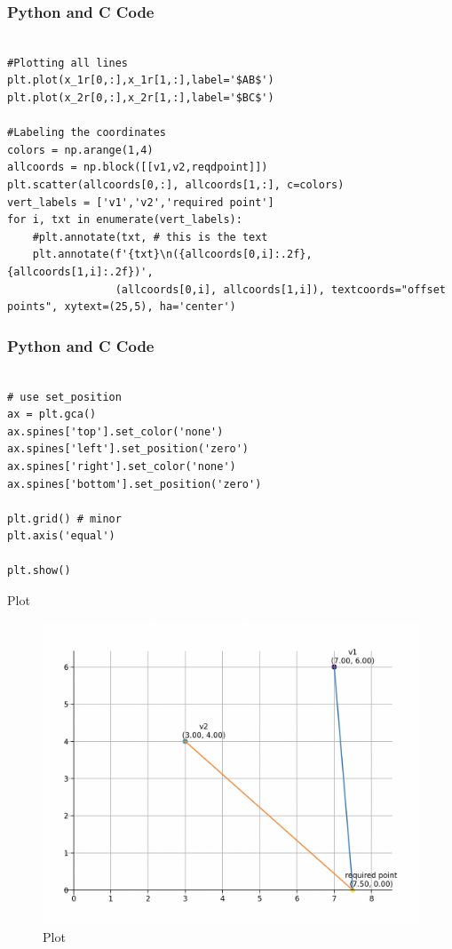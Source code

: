 \documentclass{beamer}
\begin{document}
\begin{frame}[fragile]
\frametitle{Python and C Code}
\begin{lstlisting}

#Plotting all lines
plt.plot(x_1r[0,:],x_1r[1,:],label='$AB$')
plt.plot(x_2r[0,:],x_2r[1,:],label='$BC$')

#Labeling the coordinates
colors = np.arange(1,4)
allcoords = np.block([[v1,v2,reqdpoint]])
plt.scatter(allcoords[0,:], allcoords[1,:], c=colors)
vert_labels = ['v1','v2','required point']
for i, txt in enumerate(vert_labels):
    #plt.annotate(txt, # this is the text
    plt.annotate(f'{txt}\n({allcoords[0,i]:.2f}, {allcoords[1,i]:.2f})',
                 (allcoords[0,i], allcoords[1,i]), textcoords="offset points", xytext=(25,5), ha='center') 
\end{lstlisting}
\end{frame}

\begin{frame}[fragile]
\frametitle{Python and C Code}
\begin{lstlisting}

# use set_position
ax = plt.gca()
ax.spines['top'].set_color('none')
ax.spines['left'].set_position('zero')
ax.spines['right'].set_color('none')
ax.spines['bottom'].set_position('zero')

plt.grid() # minor
plt.axis('equal')

plt.show()

\end{lstlisting}
\end{frame}

\begin{frame}{Plot}
\begin{figure}
    \centering
    \includegraphics[width=0.8\columnwidth]{Figs/Figure_2.png}
    \caption{Plot}
    \label{fig:placeholder}
\end{figure}
\end{frame}
\end{document}
